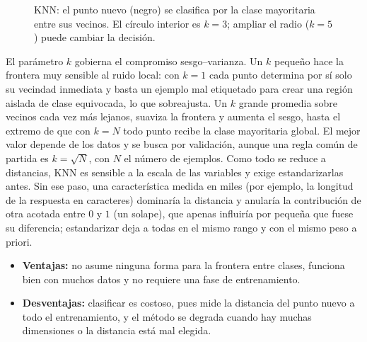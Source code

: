 \documentclass[12pt,a4paper]{report}
\theoremstyle{definition}
\begin{document}
\begin{figure}[H]
\centering
{}
\caption{KNN: el punto nuevo (negro) se clasifica por la clase mayoritaria entre sus vecinos. El
círculo interior es $k=3$; ampliar el radio ($k=5$) puede cambiar la decisión.}
\label{fig:knn}
\end{figure}

El parámetro $k$ gobierna el compromiso sesgo--varianza. Un $k$ pequeño hace la frontera muy sensible
al ruido local: con $k=1$ cada punto determina por sí solo su vecindad inmediata y basta un ejemplo mal
etiquetado para crear una región aislada de clase equivocada, lo que sobreajusta. Un $k$ grande promedia sobre
vecinos cada vez más lejanos, suaviza la frontera y aumenta el sesgo, hasta el extremo de que con $k=N$
todo punto recibe la clase mayoritaria global. El mejor valor depende de los datos y se busca por
validación, aunque una regla común de partida es $k=\sqrt{N}$, con $N$ el número de ejemplos. Como todo
se reduce a distancias, KNN es sensible a la escala de las variables y exige estandarizarlas antes. Sin
ese paso, una característica medida en miles (por ejemplo, la longitud de la respuesta en caracteres)
dominaría la distancia y anularía la contribución de otra acotada entre $0$ y $1$ (un solape), que
apenas influiría por pequeña que fuese su diferencia; estandarizar deja a todas en el mismo rango y con
el mismo peso a priori.

\begin{itemize}
\item \textbf{Ventajas:} no asume ninguna forma para la frontera entre clases, funciona bien con muchos
datos y no requiere una fase de entrenamiento.
\item \textbf{Desventajas:} clasificar es costoso, pues mide la distancia del punto nuevo a todo el
entrenamiento, y el método se degrada cuando hay muchas dimensiones o la distancia está mal elegida.
\end{itemize}
\end{document}
